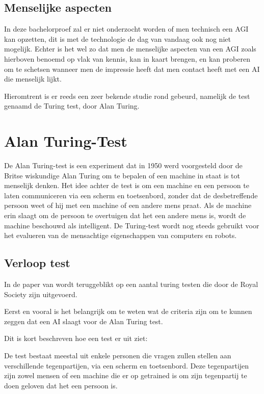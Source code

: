\newpage

\subsection{Menselijke aspecten}

In deze bachelorproef zal er niet onderzocht worden of men technisch een AGI kan opzetten, dit is met de technologie de dag van vandaag ook nog niet mogelijk. Echter is het wel zo dat men de menselijke aspecten van een AGI zoals hierboven benoemd op vlak van kennis, kan in kaart brengen, en kan proberen om te schetsen wanneer men de impressie heeft dat men contact heeft met een AI die menselijk lijkt. 

Hieromtrent is er reeds een zeer bekende  studie rond gebeurd, namelijk de test genaamd de Turing test, door Alan Turing.

\section{Alan Turing-Test}

De Alan Turing-test is een experiment dat in 1950 werd voorgesteld door de Britse wiskundige Alan Turing om te bepalen of een machine in staat is tot menselijk denken. Het idee achter de test is om een machine en een persoon te laten communiceren via een scherm en toetsenbord, zonder dat de desbetreffende persoon weet of hij met een machine of een andere mens praat. Als de machine erin slaagt om de persoon te overtuigen dat het een andere mens is, wordt de machine beschouwd als intelligent. De Turing-test wordt nog steeds gebruikt voor het evalueren van de mensachtige eigenschappen van computers en robots.

\subsection{Verloop test}

In de paper van \cite{warwick2016can} wordt teruggeblikt op een aantal turing testen die door de Royal Society zijn uitgevoerd.

Eerst en vooral is het belangrijk om te weten wat de criteria zijn om te kunnen zeggen dat een AI slaagt voor de Alan Turing test. 

Dit is kort beschreven hoe een test er uit ziet: 

De test bestaat meestal uit enkele personen die vragen zullen stellen aan verschillende tegenpartijen, via een scherm en toetsenbord. Deze tegenpartijen zijn zowel mensen of een machine die er op getrained is om zijn tegenpartij te doen geloven dat het een persoon is. 

